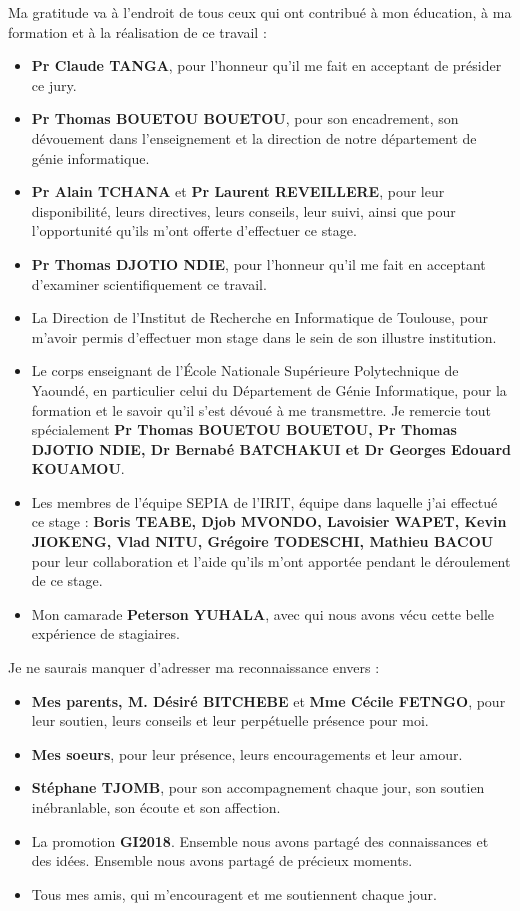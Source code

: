 \begin{SingleSpace}
Ma gratitude va à l'endroit de tous ceux qui ont contribué à mon éducation, à ma formation et à la réalisation de ce travail :

\begin{itemize}
	\item \textbf{Pr Claude TANGA}, pour l’honneur qu’il me fait en acceptant de présider ce jury.
    \item \textbf{Pr Thomas BOUETOU BOUETOU}, pour son encadrement, son dévouement dans l'enseignement et la direction de notre département de génie informatique.
    \item \textbf{Pr Alain TCHANA} et \textbf{Pr Laurent REVEILLERE}, pour leur disponibilité, leurs directives, leurs conseils, leur suivi, ainsi que pour l’opportunité qu’ils m’ont offerte d’effectuer ce stage.
    \item \textbf{Pr Thomas DJOTIO NDIE}, pour l’honneur qu’il me fait en acceptant d’examiner scientifiquement ce travail. 
    \item La Direction de l’Institut de Recherche en Informatique de Toulouse, pour m’avoir permis d’effectuer mon stage dans le sein de son illustre institution.
    \item Le corps enseignant de l’École Nationale Supérieure Polytechnique de Yaoundé, en particulier celui du Département de Génie Informatique, pour la formation et le savoir qu’il s’est dévoué à me transmettre. Je remercie tout spécialement \textbf{Pr Thomas BOUETOU BOUETOU, Pr Thomas DJOTIO NDIE, Dr Bernabé BATCHAKUI et Dr Georges Edouard KOUAMOU}.
    \item Les membres de l’équipe SEPIA de l’IRIT, équipe dans laquelle j’ai effectué ce \break stage : \textbf{Boris TEABE, Djob MVONDO, Lavoisier WAPET, Kevin JIOKENG, Vlad NITU, Grégoire TODESCHI, Mathieu BACOU} pour leur collaboration et l’aide qu’ils m’ont apportée pendant le déroulement de ce stage.
    \item Mon camarade \textbf{Peterson YUHALA}, avec qui nous avons vécu cette belle expérience de stagiaires.
\end{itemize}

\noindent Je ne saurais manquer d'adresser ma reconnaissance envers : 
\begin{itemize}
	\item \textbf{Mes parents, M. Désiré BITCHEBE} et \textbf{Mme Cécile FETNGO}, pour leur soutien, leurs conseils et leur perpétuelle présence pour moi.
	\item \textbf{Mes soeurs}, pour leur présence, leurs encouragements et leur amour.
    \item \textbf{Stéphane TJOMB}, pour son accompagnement chaque jour, son soutien inébranlable, son écoute et son affection.
    \item La promotion \textbf{GI2018}. Ensemble nous avons partagé des connaissances et des idées. Ensemble nous avons partagé de précieux moments. 
    \item Tous mes amis, qui m’encouragent et me soutiennent chaque jour.
\end{itemize}
\end{SingleSpace}
\clearpage
